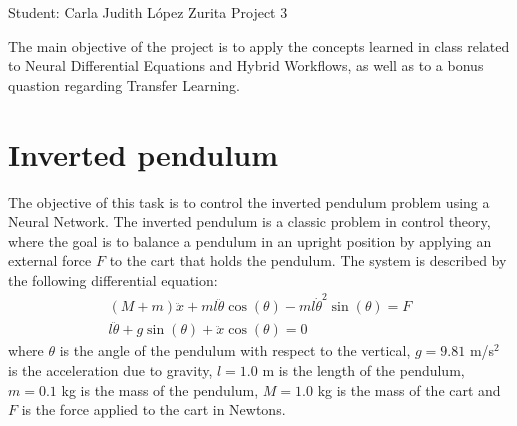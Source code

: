 \documentclass[unicode,11pt,a4paper,oneside,numbers=endperiod,openany]{scrartcl}
\begin{document}
\setassignment
{}

            {Student: Carla Judith L\'opez Zurita}
            {}{Project 3}{}
\newline

The main objective of the project is to apply the concepts learned in class
related to Neural Differential Equations and Hybrid Workflows, as well as to
a bonus quastion regarding Transfer Learning.


\section{Inverted pendulum}\label{sec:task1}
The objective of this task is to control the inverted pendulum problem using a
Neural Network. The inverted pendulum is a classic problem in control theory,
where the goal is to balance a pendulum in an upright position by applying an 
external force $F$ to the cart that holds the pendulum. 
The system is described by the following differential equation:
\begin{align}
    (M+m) \ddot{x} + m l \ddot{\theta} \cos(\theta) - m l \dot{\theta}^2 \sin(\theta) = F \\
    l \ddot{\theta} + g \sin(\theta) + \ddot{x} \cos(\theta) = 0
\end{align}
where $\theta$ is the angle of the pendulum with respect to the vertical,
$g=9.81$ m/s$^2$ is the acceleration due to gravity, $l=1.0$ m is the length of
the pendulum, $m=0.1$ kg is the mass of the pendulum, $M=1.0$ kg is the mass of
the cart and $F$ is the force applied to the cart in Newtons.
\end{document}
